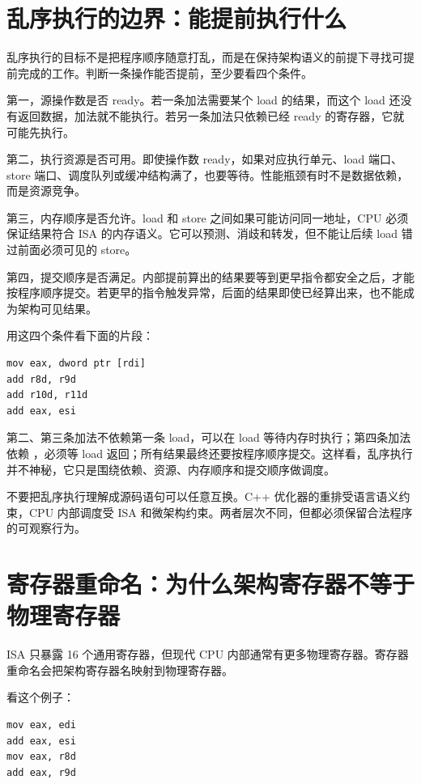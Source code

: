 \section{乱序执行的边界：能提前执行什么}

乱序执行的目标不是把程序顺序随意打乱，而是在保持架构语义的前提下寻找可提前完成的工作。判断一条操作能否提前，至少要看四个条件。

第一，源操作数是否 ready。若一条加法需要某个 load 的结果，而这个 load 还没有返回数据，加法就不能执行。若另一条加法只依赖已经 ready 的寄存器，它就可能先执行。

第二，执行资源是否可用。即使操作数 ready，如果对应执行单元、load 端口、store 端口、调度队列或缓冲结构满了，也要等待。性能瓶颈有时不是数据依赖，而是资源竞争。

第三，内存顺序是否允许。load 和 store 之间如果可能访问同一地址，CPU 必须保证结果符合 ISA 的内存语义。它可以预测、消歧和转发，但不能让后续 load 错过前面必须可见的 store。

第四，提交顺序是否满足。内部提前算出的结果要等到更早指令都安全之后，才能按程序顺序提交。若更早的指令触发异常，后面的结果即使已经算出来，也不能成为架构可见结果。

用这四个条件看下面的片段：

\begin{lstlisting}
mov eax, dword ptr [rdi]
add r8d, r9d
add r10d, r11d
add eax, esi
\end{lstlisting}

第二、第三条加法不依赖第一条 load，可以在 load 等待内存时执行；第四条加法依赖 ，必须等 load 返回；所有结果最终还要按程序顺序提交。这样看，乱序执行并不神秘，它只是围绕依赖、资源、内存顺序和提交顺序做调度。

\begin{warningbox}
不要把乱序执行理解成源码语句可以任意互换。C++ 优化器的重排受语言语义约束，CPU 内部调度受 ISA 和微架构约束。两者层次不同，但都必须保留合法程序的可观察行为。
\end{warningbox}

\section{寄存器重命名：为什么架构寄存器不等于物理寄存器}

ISA 只暴露 16 个通用寄存器，但现代 CPU 内部通常有更多物理寄存器。寄存器重命名会把架构寄存器名映射到物理寄存器。

看这个例子：

\begin{lstlisting}
mov eax, edi
add eax, esi
mov eax, r8d
add eax, r9d
\end{lstlisting}

